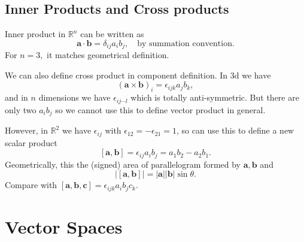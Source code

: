\documentclass[10pt]{article}
\begin{document}
    \subsection{Inner Products and Cross products}
    Inner product in $ \mathbb{R}^n $ can be written as
    \[
        \mathbf{a}\cdot \mathbf{b}=\delta_{ij}a_{i}b_{j},\quad \text{by summation convention}
    .\]
    For $n=3,$ it matches geometrical definition.

    We can also define cross product in component definition. In 3d we have
    \[
        (\mathbf{a}\times \mathbf{b})_i=\epsilon_{ijk}a_jb_k
    ,\]
    and in $n$ dimensions we have $\epsilon_{ij\cdots l}$ which is totally anti-symmetric. But there are only two $a_ib_j$ so we cannot use this to define vector product in general.

    However, in $ \mathbb{R}^2 $ we have $ \epsilon_{ij} $ with $ \epsilon_{12}=-\epsilon_{21}=1 $, so can use this to define a new scalar product 
    \[
        [\mathbf{a},\mathbf{b}]=\epsilon_{ij}a_ib_j=a_1b_2-a_2b_1
    .\]
    Geometrically, this the (signed) area of parallelogram formed by $ \mathbf{a},\mathbf{b} $ and 
    \[
        |[\mathbf{a},\mathbf{b}]|=|\mathbf{a}||\mathbf{b}|\sin \theta
    .\]
    Compare with $ [\mathbf{a},\mathbf{b},\mathbf{c}]=\epsilon_{ijk}a_ib_jc_k $.
    \section{Vector Spaces}
\end{document}
